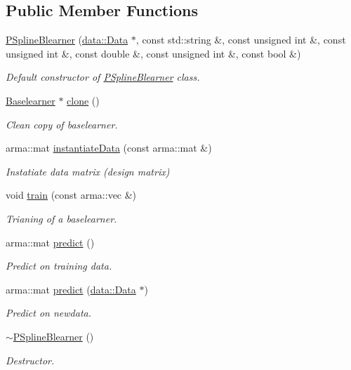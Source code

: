 \subsection*{Public Member Functions}
\begin{DoxyCompactItemize}
\item 
\mbox{\hyperlink{classblearner_1_1_p_spline_blearner_a58ec2c4bf9d0da690dd1b433c6755a87}{P\+Spline\+Blearner}} (\mbox{\hyperlink{classdata_1_1_data}{data\+::\+Data}} $\ast$, const std\+::string \&, const unsigned int \&, const unsigned int \&, const double \&, const unsigned int \&, const bool \&)
\begin{DoxyCompactList}\small\item\em Default constructor of {\ttfamily \mbox{\hyperlink{classblearner_1_1_p_spline_blearner}{P\+Spline\+Blearner}}} class. \end{DoxyCompactList}\item 
\mbox{\hyperlink{classblearner_1_1_baselearner}{Baselearner}} $\ast$ \mbox{\hyperlink{classblearner_1_1_p_spline_blearner_a6fca532d2d20dfa284acc474ee1d7531}{clone}} ()
\begin{DoxyCompactList}\small\item\em Clean copy of baselearner. \end{DoxyCompactList}\item 
arma\+::mat \mbox{\hyperlink{classblearner_1_1_p_spline_blearner_ac0604daac451678e67a6a2ac60dd1b01}{instantiate\+Data}} (const arma\+::mat \&)
\begin{DoxyCompactList}\small\item\em Instatiate data matrix (design matrix) \end{DoxyCompactList}\item 
void \mbox{\hyperlink{classblearner_1_1_p_spline_blearner_aa5c18ceb8396ffce556588486d574be8}{train}} (const arma\+::vec \&)
\begin{DoxyCompactList}\small\item\em Trianing of a baselearner. \end{DoxyCompactList}\item 
arma\+::mat \mbox{\hyperlink{classblearner_1_1_p_spline_blearner_aa46e4474a352876fbfad64921254f6d5}{predict}} ()
\begin{DoxyCompactList}\small\item\em Predict on training data. \end{DoxyCompactList}\item 
arma\+::mat \mbox{\hyperlink{classblearner_1_1_p_spline_blearner_a9d35aeb36c403c167fb7519379825873}{predict}} (\mbox{\hyperlink{classdata_1_1_data}{data\+::\+Data}} $\ast$)
\begin{DoxyCompactList}\small\item\em Predict on newdata. \end{DoxyCompactList}\item 
\mbox{\hyperlink{classblearner_1_1_p_spline_blearner_ac2d4d8cb7462735d944b6aa69896374d}{$\sim$\+P\+Spline\+Blearner}} ()
\begin{DoxyCompactList}\small\item\em Destructor. \end{DoxyCompactList}\end{DoxyCompactItemize}
